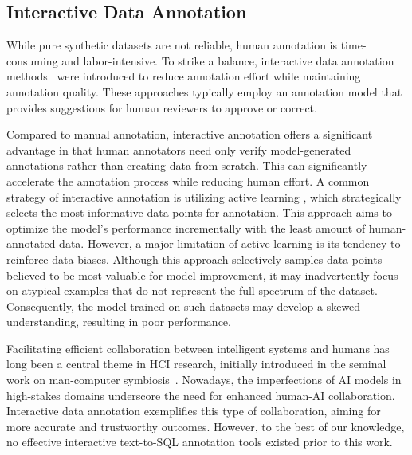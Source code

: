 

\subsection{Interactive Data Annotation}

While pure synthetic datasets are not reliable, human annotation is time-consuming and labor-intensive.
To strike a balance, interactive data annotation methods~\cite{semi_automatic_data_annotation, ARAIDA, INCEpTION, INCEpTION2, interactive_video_object_mask_annotation, freeal, fitannotator} were introduced to reduce annotation effort while maintaining annotation quality. 
These approaches typically employ an annotation model that provides suggestions for human reviewers to approve or correct.

Compared to manual annotation, interactive annotation offers a significant advantage in that human annotators need only verify model-generated annotations rather than creating data from scratch. This can significantly accelerate the annotation process while reducing human effort.
A common strategy of interactive annotation is utilizing active learning \cite{active_learning1, active_learning2, active_learning3, fitannotator, INCEpTION}, which strategically selects the most informative data points for annotation. This approach aims to optimize the model's performance incrementally with the least amount of human-annotated data.
However, a major limitation of active learning is its tendency to reinforce data biases. Although this approach selectively samples data points believed to be most valuable for model improvement, it may inadvertently focus on atypical examples that do not represent the full spectrum of the dataset. Consequently, the model trained on such datasets may develop a skewed understanding, resulting in poor performance.

Facilitating efficient collaboration between intelligent systems and humans has long been a central theme in HCI research, initially introduced in the seminal work on man-computer symbiosis~\cite{man-computer}. Nowadays, the imperfections of AI models in high-stakes domains underscore the need for enhanced human-AI collaboration. Interactive data annotation exemplifies this type of collaboration, aiming for more accurate and trustworthy outcomes. However, to the best of our knowledge, no effective interactive text-to-SQL annotation tools existed prior to this work.




